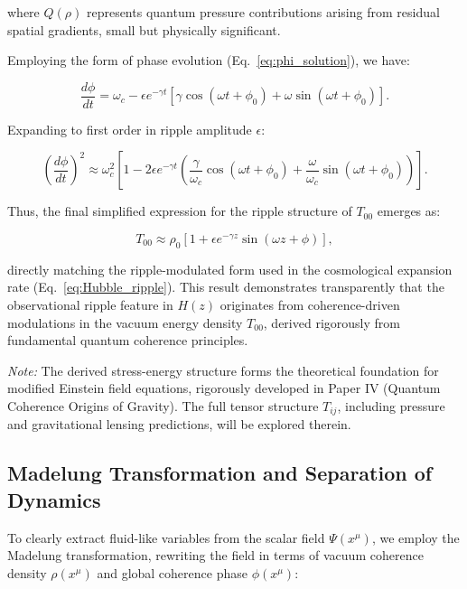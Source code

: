 where \( Q(\rho) \) represents quantum pressure contributions arising from residual spatial gradients, small but physically significant.

Employing the form of phase evolution (Eq.~\eqref{eq:phi_solution}), we have:

\begin{equation}
\frac{d\phi}{dt} = \omega_c - \epsilon e^{-\gamma t}\left[\gamma\cos(\omega t + \phi_0) + \omega\sin(\omega t + \phi_0)\right].
\label{eq:phase_modulation_derivative_1}
\end{equation}

Expanding to first order in ripple amplitude \(\epsilon\):

\begin{equation}
\left(\frac{d\phi}{dt}\right)^2 \approx \omega_c^2\left[1 - 2\epsilon e^{-\gamma t}\left(\frac{\gamma}{\omega_c}\cos(\omega t + \phi_0) + \frac{\omega}{\omega_c}\sin(\omega t + \phi_0)\right)\right].
\end{equation}

Thus, the final simplified expression for the ripple structure of \(T_{00}\) emerges as:

\begin{equation}
T_{00} \approx \rho_0\left[1 + \epsilon e^{-\gamma z}\sin(\omega z + \phi)\right],
\label{eq:t00_ripple_final}
\end{equation}

directly matching the ripple-modulated form used in the cosmological expansion rate (Eq.~\eqref{eq:Hubble_ripple}). This result demonstrates transparently that the observational ripple feature in \(H(z)\) originates from coherence-driven modulations in the vacuum energy density \(T_{00}\), derived rigorously from fundamental quantum coherence principles.

\textit{Note:} The derived stress-energy structure forms the theoretical foundation for modified Einstein field equations, rigorously developed in Paper IV (Quantum Coherence Origins of Gravity). The full tensor structure \(T_{ij}\), including pressure and gravitational lensing predictions, will be explored therein.

\subsection{Madelung Transformation and Separation of Dynamics}

To clearly extract fluid-like variables from the scalar field \(\Psi(x^\mu)\), we employ the Madelung transformation, rewriting the field in terms of vacuum coherence density \(\rho(x^\mu)\) and global coherence phase \(\phi(x^\mu)\):

